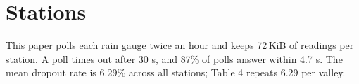 \section{Stations}
This paper polls each rain gauge twice an hour and keeps 72\,KiB of readings per station.
A poll times out after 30 s, and 87\% of polls answer within 4.7 s.
The mean dropout rate is 6.29\% across all stations; Table 4 repeats 6.29 per valley.
